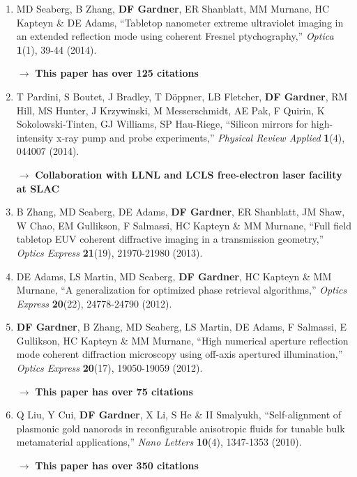 \documentclass[letterpaper,12pt]{article}
\begin{document}
\begin{enumerate}[leftmargin=*]
	\quad $\rightarrow$ \textbf{Work featured on journal and Laser Focus World covers}
	
	\quad $\rightarrow$ \textbf{This paper has over 75 citations}
	
	\item  MD Seaberg, B Zhang, \textbf{DF Gardner}, ER Shanblatt, MM Murnane, HC Kapteyn \& DE Adams, ``Tabletop nanometer extreme ultraviolet imaging in an extended reflection mode using coherent Fresnel ptychography,''  \emph{Optica} \textbf{1}(1), 39-44 (2014).
	
	\quad $\rightarrow$ \textbf{This paper has over 125 citations}
	
	\item T Pardini, S Boutet, J Bradley, T Döppner, LB Fletcher, \textbf{DF Gardner}, RM Hill, MS Hunter, J Krzywinski, M Messerschmidt, AE Pak, F Quirin, K Sokolowski-Tinten, GJ Williams, SP Hau-Riege, ``Silicon mirrors for high-intensity x-ray pump and probe experiments,''  \emph{Physical Review Applied} \textbf{1}(4), 044007 (2014).
	
	\quad $\rightarrow$ \textbf{Collaboration with LLNL and LCLS free-electron laser facility at SLAC}
	
	\item B Zhang, MD Seaberg, DE Adams, \textbf{DF Gardner}, ER Shanblatt, JM Shaw, W Chao, EM Gullikson, F Salmassi, HC Kapteyn \& MM Murnane, ``Full field tabletop EUV coherent diffractive imaging in a transmission geometry,'' \emph{Optics Express} \textbf{21}(19), 21970-21980 (2013).
	
	\item  DE Adams, LS Martin, MD Seaberg, \textbf{DF Gardner}, HC Kapteyn \& MM Murnane, ``A generalization for optimized phase retrieval algorithms,'' \emph{Optics Express} \textbf{20}(22), 24778-24790 (2012).
	
	\item \textbf{DF Gardner}, B Zhang, MD Seaberg, LS Martin, DE Adams, F Salmassi, E Gullikson, HC Kapteyn \& MM Murnane, ``High numerical aperture reflection mode coherent diffraction microscopy using off-axis apertured illumination,'' \emph{Optics Express} \textbf{20}(17), 19050-19059 (2012).
	
	\quad $\rightarrow$ \textbf{This paper has over 75 citations}
	
	\item  Q Liu, Y Cui, \textbf{DF Gardner}, X Li, S He \& II Smalyukh, ``Self-alignment of plasmonic gold nanorods in reconfigurable anisotropic fluids for tunable bulk metamaterial applications,''  \emph{Nano Letters} \textbf{10}(4), 1347-1353 (2010).
	
	\quad $\rightarrow$ \textbf{This paper has over 350 citations}

\end{enumerate}
\end{document}
